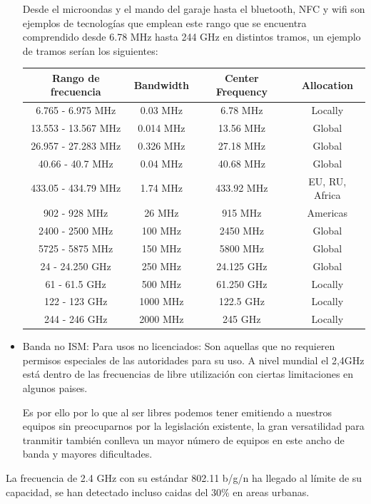 \documentclass[a4paper ,12pt, onecolumn]{article}
\begin{document}
\begin{itemize}
                Desde el microondas y el mando del garaje hasta el bluetooth, NFC y wifi son ejemplos de tecnologías
                que emplean este rango que se encuentra comprendido desde   6.78 MHz hasta 244 GHz en distintos tramos,
                un ejemplo de tramos serían los siguientes:
                \begin{center}
                    \begin{tabular}{||c | c | c| c||} 
                    \hline
                    Rango de frecuencia & Bandwidth & Center Frequency & Allocation\\ [0.5ex] 
                    \hline
                    \hline
                        6.765 - 6.975 MHz &	0.03 MHz &	6.78 MHz	 & Locally \\ 
                        13.553 - 13.567 MHz &	0.014 MHz &	13.56 MHz	 & Global\\ 
                        26.957 - 27.283 MHz &	0.326 MHz &	27.18 MHz	 & Global\\ 
                        40.66 - 40.7 MHz &	0.04 MHz &	40.68 MHz	 & Global\\ 
                        433.05 - 434.79 MHz &	1.74 MHz &	433.92 MHz & EU, RU, Africa\\ 
                        902 - 928 MHz &	26 MHz&	915 MHz &	Americas\\   
                        2400 - 2500 MHz &	100 MHz &	2450 MHz & Global\\ 
                        5725 - 5875 MHz &	150 MHz &	5800 MHz & Global\\ 
                        24 - 24.250 GHz &	250 MHz &	24.125 GHz & 	Global\\ 
                        61 - 61.5 GHz &	500 MHz &	61.250 GHz & 	Locally \\ 
                        122 - 123 GHz &	1000 MHz &	122.5 GHz	 & Locally \\ 
                        244 - 246 GHz &	2000 MHz &	245 GHz & Locally \\ 
                    \hline
                    \end{tabular}
                \end{center}
                \item Banda no ISM: Para usos no licenciados: Son aquellas que no requieren permisos especiales de las 
                autoridades para su uso. A nivel mundial el 2,4GHz está dentro de las frecuencias de libre utilización 
                con ciertas limitaciones en algunos paises.

                Es por ello por lo que al ser libres podemos tener emitiendo a nuestros equipos sin preocuparnos por
                la legislación existente, la gran versatilidad para tranmitir también conlleva un mayor número de equipos 
                en este ancho de banda y mayores dificultades.
            \end{itemize}
            La frecuencia de 2.4 GHz con su estándar 802.11 b/g/n ha llegado al límite de su capacidad, se han
            detectado incluso caidas del 30\% en areas urbanas.  
\end{document}

